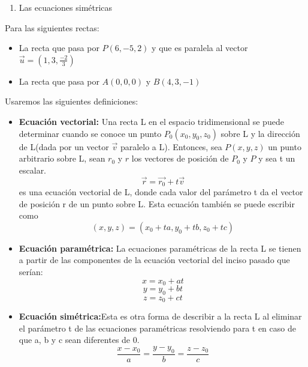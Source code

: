 \documentclass[12pt]{article}
\begin{document}
\begin{itemize}
\begin{enumerate}
\item Las ecuaciones simétricas
\end{enumerate}
Para las siguientes rectas:
\begin{itemize}
\item La recta que pasa por $P(6,-5,2)$ y que es paralela al vector $\vec{u}=(1,3,\frac{-2}{3})$
\item La recta que pasa por $A(0,0,0)$ y $B(4,3,-1)$
\end{itemize}
Usaremos las siguientes definiciones:
\begin{itemize}
\item \textbf{Ecuación vectorial:} Una recta L en el espacio tridimensional se puede determinar cuando se conoce un punto $P_0(x_0, y_0, z_0)$ sobre L y la dirección de L(dada por un vector $\vec{v}$ paralelo a L).
  Entonces, sea $P(x, y, z)$ un punto arbitrario sobre L, sean $r_0$ y $r$ los vectores de posición de $P_0$ y $P$ y sea t un escalar.
  $$\vec{r} = \vec{r_0} + t\vec{v}$$
 es una ecuación vectorial de L, donde cada valor del parámetro t da el vector de posición r de un punto sobre L.
 Esta ecuación también se puede escribir como
 $$ (x, y, z) = (x_0+ta, y_0+tb, z_0+tc)$$
\item \textbf{Ecuación paramétrica:} La ecuaciones paramétricas de la recta L se tienen a partir de las componentes de la ecuación vectorial del inciso pasado que serían:
  $$x = x_0 + at$$
  $$y = y_0 + bt$$
  $$z = z_0 + ct$$
\item \textbf{Ecuación simétrica:}Esta es otra forma de describir a la recta L al eliminar el parámetro t de las ecuaciones paramétricas resolviendo para t en caso de que a, b y c sean diferentes de 0.
  \[
  \frac{x-x_0}{a} = \frac{y-y_0}{b} = \frac{z-z_0}{c}
  \]
\end{itemize}


\end{itemize}
\end{document}
